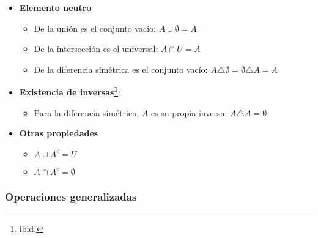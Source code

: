 \begin{itemize}
	\item\textbf{Elemento neutro}
	\begin{itemize}
		\item De la unión es el conjunto vacío: \(A \cup \emptyset = A\)
		\item De la intersección es el universal: \(A \cap U = A\)
		\item De la diferencia simétrica es el conjunto vacío: \( A \triangle \emptyset = \emptyset \triangle A = A \)
	\end{itemize}
	
	\item \textbf{Existencia de inversas\footnote{ibid.}}:
	\begin{itemize}
		\item Para la diferencia simétrica, $A$ es su propia inversa: \( A \triangle A = \emptyset \)
	\end{itemize}
	
	\item \textbf{Otras propiedades}
	\begin{itemize}
		\item \(A \cup A^c = U\)
		\item \(A \cap A^c = \emptyset\)
	\end{itemize}
	
\end{itemize}

\subsubsection{Operaciones generalizadas}


